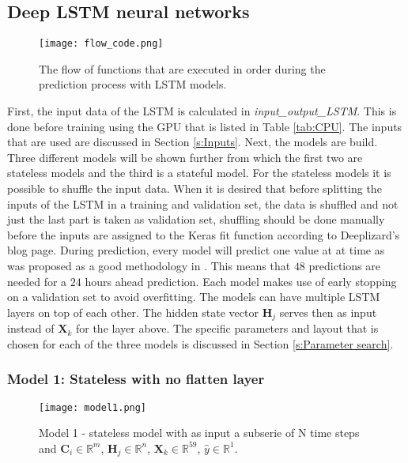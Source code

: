 \subsection{Deep LSTM neural networks}\label{s:Deep LSTM neural networks}
\begin{figure}[ht]
	\centering
	\texttt{[image: flow\_code.png]}
	\caption{The flow of functions that are executed in order during the prediction process with LSTM models.}
	\label{fig:model1}
\end{figure}


First, the input data of the LSTM is calculated in \textit{input\_output\_LSTM}. This is done before training using the GPU that is listed in Table \ref{tab:CPU}. The inputs that are used are discussed in Section \ref{s:Inputs}. Next, the models are build. Three different models will be shown further from which the first two are stateless models and the third is a stateful model. For the stateless models it is possible to shuffle the input data. When it is desired that before splitting the inputs of the LSTM in a training and validation set, the data is shuffled and not just the last part is taken as validation set, shuffling should be done manually before the inputs are assigned to the Keras fit function according to Deeplizard's blog page. During prediction, every model will predict one value at at time as was proposed as a good methodology in \cite{ANNRNN}. This means that $ 48 $ predictions are needed for a $ 24 $ hours ahead prediction. Each model makes use of early stopping on a validation set to avoid overfitting. The models can have multiple LSTM layers on top of each other. The hidden state vector $ \bm{H}_{j} $ serves then as input instead of $ \bm{X}_{k} $ for the layer above. The specific parameters and layout that is chosen for each of the three models is discussed in Section \ref{s:Parameter search}.

\subsubsection{Model 1: Stateless with no flatten layer}\label{s:Model1}

\begin{figure}[h]
	\centering
	\texttt{[image: model1.png]}
	\caption{Model 1 - stateless model with as input a subserie of N time steps and $ \bm{C}_{i} \in \mathbb{R}^{m} $, $ \bm{H}_{j} \in \mathbb{R}^{n} $, $ \bm{X}_{k} \in \mathbb{R}^{59} $, $ \hat{y} \in \mathbb{R}^{1} $.}
	\label{fig:model1}
\end{figure}

